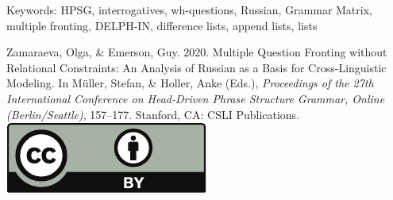 \documentclass[11pt,a4paper,fleqn]{article}
\begin{document}
\noindent
Keywords: HPSG, interrogatives, wh-questions, Russian, Grammar Matrix, multiple fronting, DELPH-IN, difference lists, append lists, lists


\vfill
\noindent
Zamaraeva, Olga, \& Emerson, Guy. 2020. Multiple Question Fronting without Relational Constraints:  An Analysis of Russian as a Basis for Cross-Linguistic Modeling. In Müller, Stefan, \& Holler, Anke (Eds.), \emph{{Proceedings of the 27th International Conference on Head-Driven Phrase Structure Grammar, Online (Berlin/Seattle)}}, 157--177. Stanford,
CA: CSLI Publications. \hfill\href{http://creativecommons.org/licenses/by/4.0/}{\includegraphics[height=.75em]{Includes/ccby-eps-converted-to.pdf}}

\newpage

\end{document}
